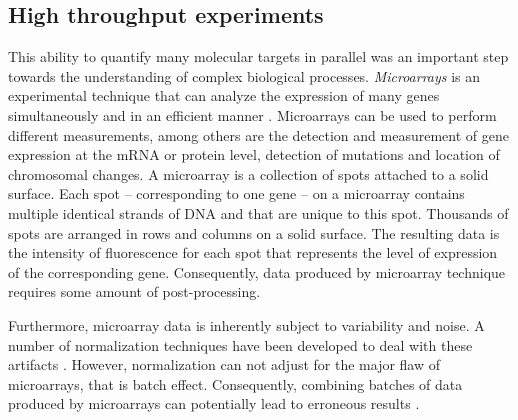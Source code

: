 \subsection{High throughput experiments}


This ability to quantify many molecular targets in parallel was an important step towards the understanding of complex biological processes.
\emph{Microarrays} is an experimental technique that can analyze the expression of many genes simultaneously and in an efficient manner \parencites{smyth2005use}{sealfon2011rna}.
Microarrays can be used to perform different measurements, among others are the detection and measurement of gene expression at the mRNA or protein level, detection of  mutations and location of chromosomal changes.
A microarray is a collection of spots attached to a solid surface.
Each spot -- corresponding to one gene -- on a microarray contains multiple identical strands of DNA and that are unique to this spot.
Thousands of spots are arranged in rows and columns on a solid surface.
The resulting data is the intensity of fluorescence for each spot that represents the level of expression of the corresponding gene.
Consequently, data produced by microarray technique requires some amount of post-processing.


	
Furthermore, microarray data is inherently subject to variability and noise.
A number of normalization techniques have been developed to deal with these artifacts \parencite{reimers2010making}.
However, normalization can not adjust for the major flaw of microarrays, that is batch effect.
Consequently, combining batches of data produced by microarrays can potentially lead to erroneous results \parencite{johnson2007adjusting}.

